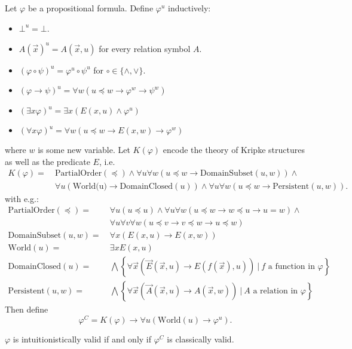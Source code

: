 \documentclass[runningheads]{llncs}
\begin{document}
\begin{definition}
	Let $\varphi$ be a propositional formula. Define $\varphi^{u}$ inductively:
	\begin{itemize}
		\item $\bot^u = \bot$.
		\item $A(\vec x)^{u} = A(\vec x, u)$ for every relation symbol $A$.
		\item $(\varphi\circ\psi)^u = \varphi^u\circ\psi^u$ for $\circ\in\{\wedge, \vee\}$.
		\item $(\varphi\to \psi)^u = \forall w(u\preceq w\to\varphi^{w}\to\psi^{w})$
		\item $(\exists x\varphi)^u = \exists x(E(x,u)\wedge\varphi^u)$
		\item $(\forall x\varphi)^u = \forall w(u\preceq w\to E(x, w)\to \varphi^w)$
	\end{itemize}
	where $w$ is some new variable. Let $K(\varphi)$ encode the theory of Kripke structures as well as the predicate $E$, i.e.
	\begin{align*}
		K(\varphi) = \:& \text{PartialOrder}(\preceq) \wedge \forall u \forall w (u\preceq w\to \text{DomainSubset}(u, w)) \wedge\\
		& \forall u(\text{World(u)}\to \text{DomainClosed}(u))\wedge \forall u\forall w (u\preceq w\to \text{Persistent}(u, w)).
	\end{align*}
	with e.g.:
	\begin{align*}
		\text{PartialOrder}(\preceq) = &\:\forall u(u\preceq u)\wedge\forall u\forall w(u\preceq w\to w\preceq u\to u = w)\wedge\\&\:\forall u\forall v\forall w(u\preceq v\to v\preceq w\to u\preceq w)\\
		\text{DomainSubset}(u, w) = &\:\forall x(E(x, u)\to E(x, w))\\
		\text{World}(u) = &\:\exists xE(x, u)\\
		\text{DomainClosed}(u) = &\:\bigwedge\left\{\forall\vec x(\vec E(\vec x, u)\to E(f(\vec x), u))\:|\:\text{$f$ a function in $\varphi$}\right\}\\
		\text{Persistent}(u, w) = &\:\bigwedge\left\{\forall\vec x(\vec A(\vec x, u)\to A(\vec x, w))\:|\:\text{$A$ a relation in $\varphi$}\right\}
	\end{align*}
	Then define
	$$\varphi^C = K(\varphi)\to\forall u(\text{World}(u)\to \varphi^u).$$
\end{definition}

\begin{lemma}\label{lemma:fo-simplification}
	$\varphi$ is intuitionistically valid if and only if $\varphi^C$ is classically valid.
\end{lemma}
\end{document}
